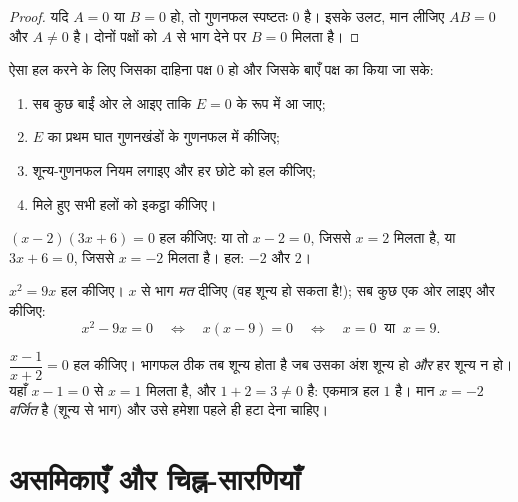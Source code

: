 \begin{proof}
यदि $A = 0$ या $B = 0$ हो, तो गुणनफल स्पष्टतः $0$ है। इसके उलट, मान लीजिए $AB = 0$
और $A \neq 0$ है। दोनों पक्षों को $A$ से भाग देने पर $B = 0$ मिलता है।
\end{proof}

\begin{method}\label{met:g10:algebra:zeroproduct}
ऐसा  हल करने के लिए जिसका दाहिना पक्ष $0$ हो और जिसके बाएँ पक्ष का
 किया जा सके:
\begin{enumerate}
  \item सब कुछ बाईं ओर ले आइए ताकि  $E = 0$ के रूप में आ जाए;
  \item $E$ का प्रथम घात गुणनखंडों के गुणनफल में  कीजिए;
  \item शून्य-गुणनफल नियम लगाइए और हर छोटे  को हल कीजिए;
  \item मिले हुए सभी हलों को इकट्ठा कीजिए।
\end{enumerate}
\end{method}

\begin{example}\label{ex:g10:algebra:zeroproduct}
$(x - 2)(3x + 6) = 0$ हल कीजिए: या तो $x - 2 = 0$, जिससे $x = 2$ मिलता है, या $3x + 6 = 0$, जिससे $x = -2$
मिलता है। हल: $-2$ और $2$।

$x^2 = 9x$ हल कीजिए। $x$ से भाग \emph{मत} दीजिए (वह शून्य हो सकता है!); सब कुछ
एक ओर लाइए और  कीजिए:
\[
x^2 - 9x = 0
\quad\Longleftrightarrow\quad
x(x - 9) = 0
\quad\Longleftrightarrow\quad
x = 0 \ \text{ या } \ x = 9 .
\]
\end{example}

\begin{example}\label{ex:g10:algebra:quotient}
$\dfrac{x - 1}{x + 2} = 0$ हल कीजिए। भागफल ठीक तब शून्य होता है जब उसका अंश शून्य हो \emph{और}
हर शून्य न हो। यहाँ $x - 1 = 0$ से $x = 1$ मिलता है, और $1 + 2 = 3 \neq 0$ है: एकमात्र हल $1$ है।
मान $x = -2$ \emph{वर्जित} है (शून्य से भाग) और उसे हमेशा पहले ही हटा देना
चाहिए।
\end{example}

\section{असमिकाएँ और चिह्न-सारणियाँ}

